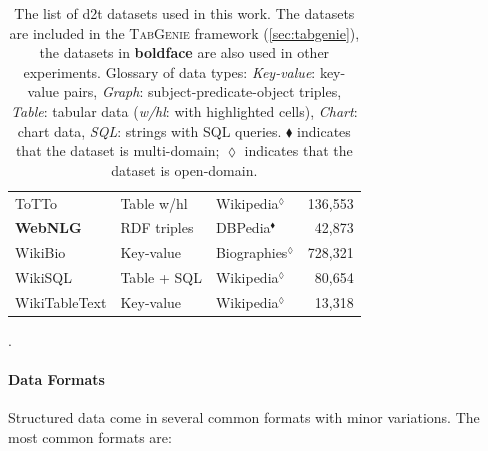 \begin{table}[t]
\begin{tabular}{@{}lllr@{}}
        ToTTo \cite{parikhToTToControlledTableToText2020}                                          & Table w/hl           & Wikipedia$^\lozenge$    & 136,553         \\
        \textbf{WebNLG} \cite{gardentWebNLGChallengeGenerating2017}                                & RDF triples          & DBPedia$^\blacklozenge$ & 42,873          \\
        WikiBio \cite{lebretNeuralTextGeneration2016}                                              & Key-value            & Biographies$^\lozenge$  & 728,321         \\
        WikiSQL \cite{zhong2017seq2sql}                                                            & Table + SQL          & Wikipedia$^\lozenge$    & 80,654          \\
        WikiTableText \cite{bao2018table}                                                          & Key-value            & Wikipedia$^\lozenge$    & 13,318          \\
        \bottomrule
    \end{tabular}
    \caption{The list of \ac{d2t} datasets used in this work. The datasets are included in the \textsc{TabGenie} framework (\autoref{sec:tabgenie}), the datasets in \textbf{boldface} are also used in other experiments. Glossary of data types: \textit{Key-value}: key-value pairs, \textit{Graph}: subject-predicate-object triples, \textit{Table}: tabular data (\textit{w/hl}: with highlighted cells), \textit{Chart}: chart data, \textit{SQL}: strings with SQL queries. $\blacklozenge$ indicates that the dataset is multi-domain; $\lozenge$ indicates that the dataset is open-domain.}
    \label{tab:datasets}.
\end{table}

\paragraph{Data Formats} Structured data come in several common formats with minor variations. The most common formats are:

